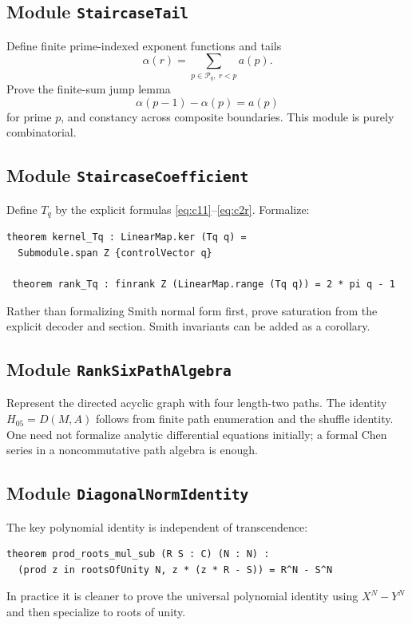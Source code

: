 \documentclass[11pt]{article}
\theoremstyle{definition}
\theoremstyle{remark}
\newcommand{\cP}{\mathcal P}
\begin{document}
\subsection{Module \texttt{StaircaseTail}}

Define finite prime-indexed exponent functions and tails
\[
 \alpha(r)=\sum_{p\in\cP_q,\ r<p}a(p).
\]
Prove the finite-sum jump lemma
\[
 \alpha(p-1)-\alpha(p)=a(p)
\]
for prime $p$, and constancy across composite boundaries.  This module is purely
combinatorial.

\subsection{Module \texttt{StaircaseCoefficient}}

Define $T_q$ by the explicit formulas
\eqref{eq:c11}--\eqref{eq:c2r}.  Formalize:
\begin{lstlisting}
theorem kernel_Tq : LinearMap.ker (Tq q) =
  Submodule.span Z {controlVector q}

 theorem rank_Tq : finrank Z (LinearMap.range (Tq q)) = 2 * pi q - 1
\end{lstlisting}
Rather than formalizing Smith normal form first, prove saturation from the
explicit decoder and section.  Smith invariants can be added as a corollary.

\subsection{Module \texttt{RankSixPathAlgebra}}

Represent the directed acyclic graph with four length-two paths.  The identity
$H_{05}=D(M,A)$ follows from finite path enumeration and the shuffle identity.
One need not formalize analytic differential equations initially; a formal Chen
series in a noncommutative path algebra is enough.

\subsection{Module \texttt{DiagonalNormIdentity}}

The key polynomial identity is independent of transcendence:
\begin{lstlisting}
theorem prod_roots_mul_sub (R S : C) (N : N) :
  (prod z in rootsOfUnity N, z * (z * R - S)) = R^N - S^N
\end{lstlisting}
In practice it is cleaner to prove the universal polynomial identity using
$X^N-Y^N$ and then specialize to roots of unity.
\end{document}
